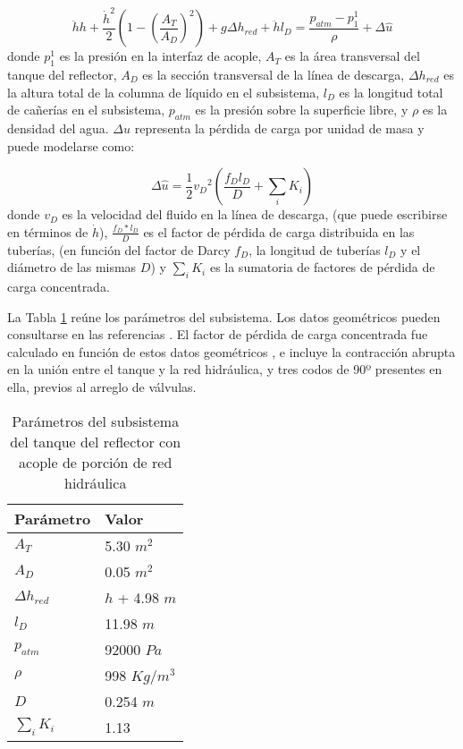 \begin{equation}
\ddot{h} h + \frac{\dot{h}^2}{2}\left( 1- \left(\frac{A_T}{A_D} \right)^2 \right) + g \Delta h_{red} + \ddot{h}  l_D = 
\frac{p_{atm}-p_1^1}{\rho} + \Delta \hat{u}
\label{eq-tanque}
\end{equation}
donde $p_1^1$ es la presión en la interfaz de acople,
$A_T$ es la área transversal del tanque del reflector, 
$A_D$ es la sección transversal de la línea de descarga,
$\Delta h_{red}$ es la altura total de la columna de líquido en el subsistema,
$l_D$ es la longitud total de cañerías en el subsistema,
$p_{atm}$ es la presión sobre la superficie libre,
y $\rho$ es la densidad del agua.
$\Delta \hat{u}$ representa la pérdida de carga por unidad de masa y puede modelarse como:

\begin{equation}
\Delta \hat{u} = \frac {1} {2} {v_D}^2 \left( \frac {f_D l_D}{D} + \sum_i K_i \right)
\end{equation}
donde $v_D$ es la velocidad del fluido en la línea de descarga,
(que puede escribirse en términos de $\dot{h}$),
$\frac {f_D*l_D}{D}$ es el factor de pérdida de carga distribuida en las tuberías,
(en función del factor de Darcy $f_D$, la longitud de tuberías $l_D$ y el diámetro de las mismas $D$)
y $\sum_i K_i$ es la sumatoria de factores de pérdida de carga concentrada.

La Tabla \ref{tabla-tanque} reúne los parámetros del subsistema.
Los datos geométricos pueden consultarse en las referencias \cite{invap-mockup}.
El factor de pérdida de carga concentrada fue calculado en función de estos datos geométricos \cite{iedelchik},
e incluye la contracción abrupta en la unión entre el tanque y la red hidráulica,
y tres codos de 90º presentes en ella, previos al arreglo de válvulas.

\begin{table}[]
\centering
\begin{tabular}{|l|l|}
\hline
Parámetro        & Valor          \\ \hline
$A_T$            & 5.30 $m^2$     \\ \hline
$A_D$            & 0.05 $m^2$     \\ \hline
$\Delta h_{red}$ & $h$ + 4.98 $m$ \\ \hline
$l_D$            & 11.98 $m$      \\ \hline
$p_{atm}$        & 92000 $Pa$     \\ \hline
$\rho$           & 998 $Kg/m^3$   \\ \hline
$D$              & 0.254 $m$      \\ \hline
$\sum_i K_i$     & 1.13           \\ \hline
\end{tabular}
\caption{Parámetros del subsistema del tanque del reflector con acople de porción de red hidráulica}
\label{tabla-tanque}
\end{table}


